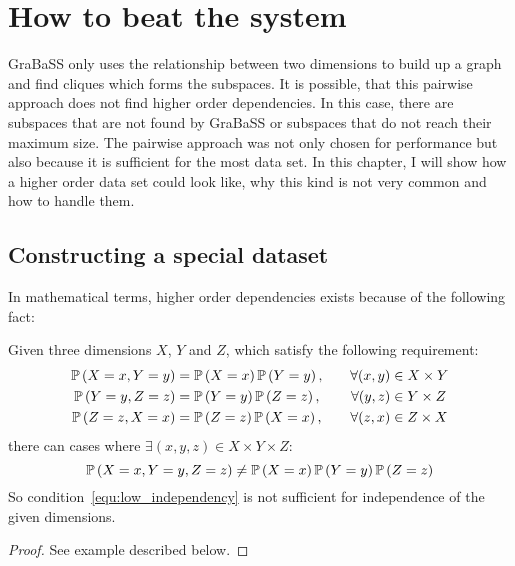 \chapter{How to beat the system}\label{chap:beat}
GraBaSS only uses the relationship between two dimensions to build up a graph and find cliques which forms the subspaces. It is possible, that this pairwise approach does not find higher order dependencies. In this case, there are subspaces that are not found by GraBaSS or subspaces that do not reach their maximum size. The pairwise approach was not only chosen for performance but also because it is sufficient for the most data set. In this chapter, I will show how a higher order data set could look like, why this kind is not very common and how to handle them.

\section{Constructing a special dataset}\label{sec:constr}
In mathematical terms, higher order dependencies exists because of the following fact:
\begin{envtheo}\label{theo:lowdep}
	Given three dimensions $X$, $Y$ and $Z$, which satisfy the following requirement:
	\begin{equation}\label{equ:low_independency}
		\begin{aligned}
			\mathbb{P}\left(X = x, Y = y\right) &= \mathbb{P}\left(X = x\right) \mathbb{P}\left(Y = y\right),\quad & \forall (x,y) &\in X \times Y \\
			\mathbb{P}\left(Y = y, Z = z\right) &= \mathbb{P}\left(Y = y\right) \mathbb{P}\left(Z = z\right),\quad & \forall (y,z) &\in Y \times Z \\
			\mathbb{P}\left(Z = z, X = x\right) &= \mathbb{P}\left(Z = z\right) \mathbb{P}\left(X = x\right),\quad & \forall (z,x) &\in Z \times X
		\end{aligned}
	\end{equation}
	there can cases where $\exists (x,y,z) \in X \times Y \times Z$:
	\begin{equation}
		\mathbb{P}\left(X = x, Y = y, Z = z\right) \neq \mathbb{P}\left(X = x\right) \mathbb{P}\left(Y = y\right) \mathbb{P}\left(Z = z\right)
	\end{equation}
	So condition~\ref{equ:low_independency} is not sufficient for independence of the given dimensions.
\end{envtheo}
\begin{proof}
	See example described below.
\end{proof}

